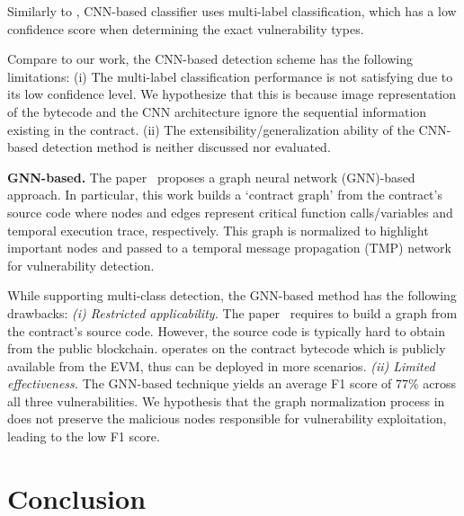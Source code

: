 Similarly to \sys{}, CNN-based classifier uses multi-label classification, which has a low confidence score when determining the exact vulnerability types. %

Compare to our work, the CNN-based detection scheme has the following limitations: (i) The multi-label classification performance is not satisfying due to its low confidence level. We hypothesize that this is because image representation of the bytecode and the CNN architecture ignore the sequential information existing in the contract. (ii) The extensibility/generalization ability of the CNN-based detection method is neither discussed nor evaluated. 

\textbf{GNN-based.} The paper~\cite{zhuangsmart} proposes a graph neural network (GNN)-based approach. In particular, this work builds a `contract graph' from the contract's source code where nodes and edges represent critical function calls/variables and temporal execution trace, respectively. This graph is normalized to highlight important nodes and passed to a temporal message propagation (TMP) network for vulnerability detection. 

While supporting multi-class detection, the GNN-based method has the following drawbacks: \textit{(i) Restricted applicability.} The paper~\cite{zhuangsmart} requires to build a graph from the contract's source code. However, the source code is typically hard to obtain from the public blockchain. \sys{} operates on the contract bytecode which is publicly available from the EVM, thus can be deployed in more scenarios. \textit{(ii) Limited effectiveness.} The GNN-based technique yields an average F1 score of $77\%$ across all three vulnerabilities. We hypothesis that the graph normalization process in~\cite{zhuangsmart} does not preserve the malicious nodes responsible for vulnerability exploitation, leading to the low F1 score. \vspace{-0.7em}
\section{Conclusion}
\label{sec:conclusion}

